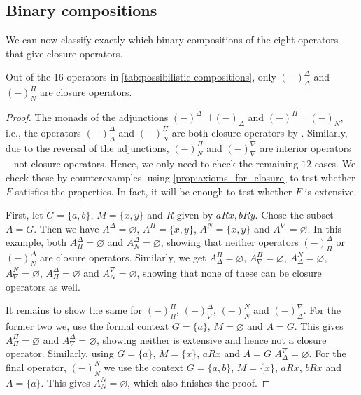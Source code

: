\subsection{Binary compositions}

We can now classify exactly which binary compositions of the eight operators that give closure operators. 

\begin{theorem}
    Out of the 16 operators in \cref{tab:possibilistic-compositions}, only $(-)^\Delta_\Delta$ and $(-)^\Pi_N$ are closure operators. 
\end{theorem}
\begin{proof}
    The monads of the adjunctions $(-)^\Delta \dashv (-)_\Delta$ and $(-)^\Pi \dashv (-)_N$, i.e., the operators $(-)^\Delta_\Delta$ and $(-)^\Pi_N$ are both closure operators by \cite[2.1.11]{jarvis_2025}. Similarly, due to the reversal of the adjunctions, $(-)^\Pi_N$ and $(-)^\nabla_\nabla$ are interior operators -- not closure operators. Hence, we only need to check the remaining $12$ cases. We check these by counterexamples, using \cref{prop:axioms_for_closure} to test whether $F$ satisfies the properties. In fact, it will be enough to test whether $F$ is extensive. 

    First, let $G=\{a,b\}$, $M=\{x,y\}$ and $R$ given by $aRx, bRy$. Chose the subset $A=G$. Then we have $A^\Delta = \varnothing$, $A^\Pi = \{x,y\}$, $A^N=  \{x,y\}$ and $A^\nabla = \varnothing$. In this example, both $A^\Delta_\Pi = \varnothing$ and $A^\Delta_N = \varnothing$, showing that neither operators $(-)^\Delta_\Pi$ or $(-)^\Delta_N$ are closure operators. Similarly, we get $A^\Pi_\Delta = \varnothing$, $A^\Pi_\nabla=\varnothing$, $A^N_\Delta = \varnothing$, $A^N_\nabla = \varnothing$, $A^\Delta_\Pi = \varnothing$ and $A^\nabla_N = \varnothing$, showing that none of these can be closure operators as well. 

    It remains to show the same for $(-)^\Pi_\Pi$, $(-)^\Delta_\nabla$, $(-)^N_N$ and $(-)^\nabla_\Delta$. For the former two we, use the formal context $G=\{a\}$, $M=\varnothing$ and $A=G$. This gives $A^\Pi_\Pi = \varnothing$ and $A^\Delta_\nabla = \varnothing$, showing neither is extensive and hence not a closure operator. Similarly, using $G=\{a\}$, $M=\{x\}$, $aRx$ and $A=G$ $A^\nabla_\Delta = \varnothing$. For the final operator, $(-)^N_N$ we use the context $G=\{a,b\}$, $M=\{x\}$, $aRx$, $bRx$ and $A=\{a\}$. This gives $A^N_N = \varnothing$, which also finishes the proof. 
\end{proof}

